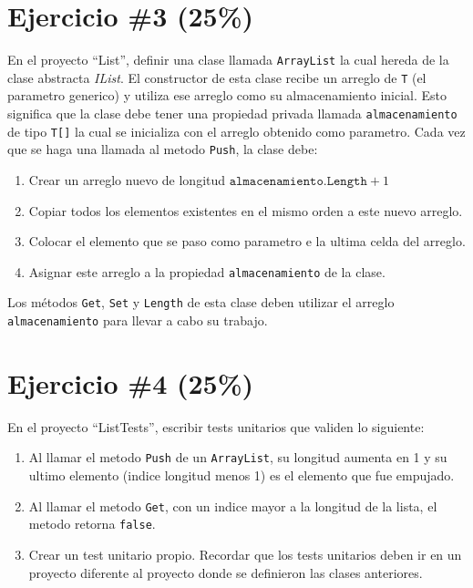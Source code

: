 \documentclass{article}
\begin{document}
\section*{Ejercicio \#3 (25\%)}
En el proyecto ``List'', definir una clase llamada \texttt{ArrayList} la cual hereda de la clase abstracta
\emph{IList}. El constructor de esta clase recibe un arreglo de \texttt{T} (el 
parametro generico) y utiliza ese arreglo como su almacenamiento inicial. Esto
significa que la clase debe tener una propiedad privada llamada \texttt{almacenamiento}
de tipo \texttt{T[]} la cual se inicializa con el arreglo obtenido como parametro.
Cada vez que se haga una llamada al metodo \texttt{Push}, la clase debe:
\begin{enumerate}
        \item{Crear un arreglo nuevo de longitud $\mathtt{almacenamiento.Length}+1$}
        \item{Copiar todos los elementos existentes en el mismo orden a este nuevo arreglo.}
        \item{Colocar el elemento que se paso como parametro e la ultima celda del arreglo.}
        \item{Asignar este arreglo a la propiedad \texttt{almacenamiento} de la clase.}
\end{enumerate}
Los m\'etodos \texttt{Get}, \texttt{Set} y \texttt{Length} de esta clase deben utilizar
el arreglo \texttt{almacenamiento} para llevar a cabo su trabajo. 
\section*{Ejercicio \#4 (25\%)}
En el proyecto ``ListTests'', escribir tests unitarios que validen lo siguiente:
\begin{enumerate}
        \item{Al llamar el metodo \texttt{Push} de un \texttt{ArrayList}, su longitud
        aumenta en 1 y su ultimo elemento (indice longitud menos 1) es el elemento que
        fue empujado.}
        \item{Al llamar el metodo \texttt{Get}, con un indice mayor a la longitud de la
        lista, el metodo retorna \texttt{false}.}
        \item{Crear un test unitario propio.}
Recordar que los tests unitarios deben ir en un proyecto diferente al proyecto
donde se definieron las clases anteriores.
\end{enumerate}
\end{document}
